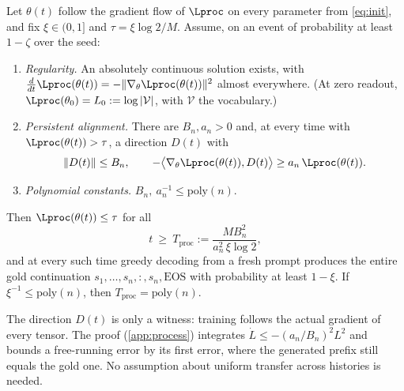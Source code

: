 \begin{theorem}\label{thm:process}
Let $\theta(t)$ follow the gradient flow of $\Lproc$ on every parameter from \cref{eq:init}, and fix $\xi\in(0,1]$ and $\tau=\xi\log2/M$. Assume, on an event of probability at least $1-\zeta$ over the seed:
\begin{enumerate}[label=(P\arabic*),ref=(P\arabic*),leftmargin=*,itemsep=2pt]
\item\label{hyp:regular} \emph{Regularity.} An absolutely continuous solution exists, with $\frac{d}{dt}\Lproc(\theta(t))=-\|\nabla_\theta\Lproc(\theta(t))\|^2$ almost everywhere. (At zero readout, $\Lproc(\theta_0)=L_0:=\log|\mathcal V|$, with $\mathcal V$ the vocabulary.)
\item\label{hyp:align} \emph{Persistent alignment.} There are $B_n,a_n>0$ and, at every time with $\Lproc(\theta(t))>\tau$, a direction $D(t)$ with
\begin{equation}\label{eq:align}
\|D(t)\|\le B_n,\qquad -\bigl\langle\nabla_\theta\Lproc(\theta(t)),D(t)\bigr\rangle\ge a_n\,\Lproc(\theta(t)).
\end{equation}
\item\label{hyp:poly} \emph{Polynomial constants.} $B_n,\ a_n^{-1}\le\mathrm{poly}(n)$.
\end{enumerate}
Then $\Lproc(\theta(t))\le\tau$ for all
\begin{equation}\label{eq:proc-time}
t\ \ge\ T_{\mathrm{proc}}:=\frac{M B_n^2}{a_n^2\,\xi\log2},
\end{equation}
and at every such time greedy decoding from a fresh prompt produces the entire gold continuation $s_1,\ldots,s_n,{:},s_n,\mathrm{EOS}$ with probability at least $1-\xi$. If $\xi^{-1}\le\mathrm{poly}(n)$, then $T_{\mathrm{proc}}=\mathrm{poly}(n)$.
\end{theorem}
The direction $D(t)$ is only a witness: training follows the actual gradient of every tensor. The proof (\cref{app:process}) integrates $\dot L\le-(a_n/B_n)^2L^2$ and bounds a free-running error by its first error, where the generated prefix still equals the gold one. No assumption about uniform transfer across histories is needed.

